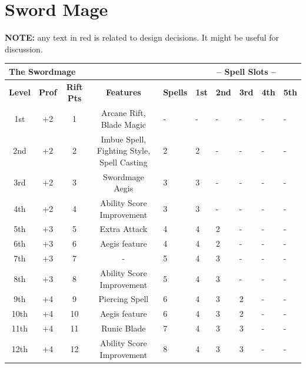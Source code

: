 \chapter{Sword Mage}

{\color{red}  \textbf{NOTE:} any text in red is related to design decisions. It might be useful for discussion.}    

\begin{table}[ht!]
\begin{small}
\begin{center}
\begin{tabular}{ccccllllll}
\multicolumn{5}{l}{\parbox[l][0.6cm][c]{8cm}{\textbf{The Swordmage}}} & 
\multicolumn{5}{c}{\textbf{-- Spell Slots --}}
\\
\hline 
\textbf{Level} & \textbf{Prof} & \textbf{Rift Pts} & \parbox[l][0.6cm][c]{8cm}{\textbf{Features}} & \textbf{Spells} & \textbf{1st} & \textbf{2nd} & \textbf{3rd} & \textbf{4th} & \textbf{5th}
\\ 
1st & +2 &  1   & \parbox[l][0.6cm][c]{8cm}{Arcane Rift, Blade Magic} & - & - & - & - & - & -\\
2nd & +2 &  2   & \parbox[l][0.6cm][c]{8cm}{Imbue Spell, Fighting Style, Spell Casting} & 2  & 2 & - & - & - & -\\
3rd & +2 &  3   & \parbox[l][0.6cm][c]{8cm}{Swordmage Aegis} & 3 & 3 & - & -& - & -\\
4th & +2 &  4   & \parbox[l][0.6cm][c]{8cm}{Ability Score Improvement} & 3  & 3 & - & - & - & -\\
5th & +3 &  5   & \parbox[l][0.6cm][c]{8cm}{Extra Attack} & 4 & 4 & 2 & - & - & -\\
6th & +3 &  6   & \parbox[l][0.6cm][c]{8cm}{Aegis feature} & 4 & 4 & 2 & - & - & -\\
7th & +3 &  7   & \parbox[l][0.6cm][c]{8cm}{-} & 5 & 4 & 3 & - & - & -\\
8th & +3 &  8   & \parbox[l][0.6cm][c]{8cm}{Ability Score Improvement} & 5 & 4 & 3 & - & - & -\\
9th & +4 &  9  & \parbox[l][0.6cm][c]{8cm}{Piercing Spell} & 6 & 4 & 3 & 2 & - & -\\
10th & +4 & 10  & \parbox[l][0.6cm][c]{8cm}{Aegis feature} & 6  & 4 & 3 & 2 & - & -\\
11th & +4 & 11 & \parbox[l][0.6cm][c]{8cm}{Runic Blade} & 7 & 4 & 3 & 3 & - & -\\
12th & +4 & 12  & \parbox[l][0.6cm][c]{8cm}{Ability Score Improvement} & 8 & 4 & 3 & 3 & - & -\\

\end{tabular}
\end{center}
\end{small}
\end{table}
